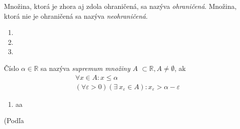 Množina, ktorá je zhora aj zdola ohraničená, sa nazýva \textit{ohraničená}.
Množina, ktorá nie je ohraničená sa nazýva \textit{neohraničená}.

\begin{enumerate}[resume]
	\item {}
	\item {}
	\item {}
\end{enumerate}


Číslo $\alpha \in \mathbb{R}$ sa nazýva \textit{supremum množiny $A$}
$\subset \mathbb{R}, A \neq \emptyset$, ak
\begin{align}
\forall x \in A: x \leq \alpha \label{eq:supremum-i} \tag{\cloud} \\
(\forall \varepsilon > 0) (\exists \: x_\varepsilon \in A):
x_\varepsilon > \alpha - \varepsilon
\end{align}



\begin{enumerate}[resume]
\item aa
\end{enumerate}

(Podľa 
